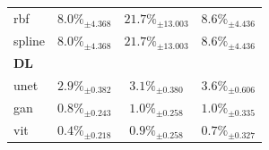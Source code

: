 \begin{table}[htbp]
{\begin{tabular}{lccc}
rbf & $8.0\%_{\pm 4.368}$ & $21.7\%_{\pm 13.003}$ & $8.6\%_{\pm 4.436}$ \\
spline & $8.0\%_{\pm 4.368}$ & $21.7\%_{\pm 13.003}$ & $8.6\%_{\pm 4.436}$ \\
\midrule
\multicolumn{4}{l}{\textbf{DL}} \\
unet & $2.9\%_{\pm 0.382}$ & $3.1\%_{\pm 0.380}$ & $3.6\%_{\pm 0.606}$ \\
gan & $0.8\%_{\pm 0.243}$ & $1.0\%_{\pm 0.258}$ & $1.0\%_{\pm 0.335}$ \\
vit & $0.4\%_{\pm 0.218}$ & $0.9\%_{\pm 0.258}$ & $0.7\%_{\pm 0.327}$ \\
\bottomrule
\end{tabular}
}
\end{table}
